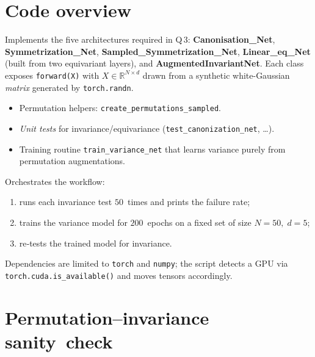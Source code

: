 \section{Code overview}
\label{sec:code}

\begin{description}[leftmargin=2.1em, style=nextline]
	\item[\texttt{models.py}]  
	Implements the five architectures required in Q\,3:  
	\textbf{Canonisation\_Net}, \textbf{Symmetrization\_Net},
	\textbf{Sampled\_Symmetrization\_Net},
	\textbf{Linear\_eq\_Net} (built from two equivariant layers),
	and \textbf{AugmentedInvariantNet}.  
	Each class exposes \texttt{forward(X)} with $X\in\mathbb R^{N\times d}$ drawn from a synthetic white-Gaussian \emph{matrix} generated by \verb|torch.randn|.
	
	\item[\texttt{utils.py}]  
	\begin{itemize}[nosep,leftmargin=1.2em]
		\item Permutation helpers: \texttt{create\_permutations\_sampled}.
		\item \emph{Unit tests} for invariance/equivariance
		(\texttt{test\_canonization\_net}, \dots).
		\item Training routine
		\texttt{train\_variance\_net} that learns variance purely from
		permutation augmentations.
	\end{itemize}
	
	\item[\texttt{main.py}]  
	Orchestrates the workflow:
	\begin{enumerate}[leftmargin=2em]
		\item runs each invariance test $50$ times and prints the failure rate;
		\item trains the variance model for $200$ epochs on a fixed set
		of size $N=50,\;d=5$;
		\item re‑tests the trained model for invariance.
	\end{enumerate}
\end{description}


Dependencies are limited to \texttt{torch} and \texttt{numpy}; the script detects a GPU via \texttt{torch.cuda.is\_available()} and moves tensors accordingly.
\section{Permutation–invariance sanity check}
\label{sec:inv}

